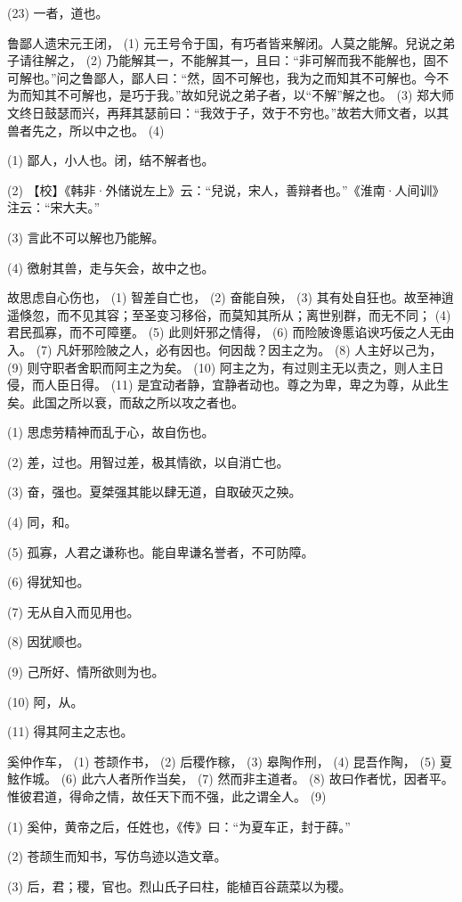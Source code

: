 \documentclass[12pt,UTF8]{ctexbook}
\begin{document}
(23) 一者，道也。

鲁鄙人遗宋元王闭， (1) 元王号令于国，有巧者皆来解闭。人莫之能解。兒说之弟子请往解之， (2) 乃能解其一，不能解其一，且曰：“非可解而我不能解也，固不可解也。”问之鲁鄙人，鄙人曰：“然，固不可解也，我为之而知其不可解也。今不为而知其不可解也，是巧于我。”故如兒说之弟子者，以“不解”解之也。 (3) 郑大师文终日鼓瑟而兴，再拜其瑟前曰：“我效于子，效于不穷也。”故若大师文者，以其兽者先之，所以中之也。 (4)

(1) 鄙人，小人也。闭，结不解者也。

(2) 【校】《韩非·外储说左上》云：“兒说，宋人，善辩者也。”《淮南·人间训》注云：“宋大夫。”

(3) 言此不可以解也乃能解。

(4) 徼射其兽，走与矢会，故中之也。

故思虑自心伤也， (1) 智差自亡也， (2) 奋能自殃， (3) 其有处自狂也。故至神逍遥倏忽，而不见其容；至圣变习移俗，而莫知其所从；离世别群，而无不同； (4) 君民孤寡，而不可障壅。 (5) 此则奸邪之情得， (6) 而险陂谗慝谄谀巧佞之人无由入。 (7) 凡奸邪险陂之人，必有因也。何因哉？因主之为。 (8) 人主好以己为， (9) 则守职者舍职而阿主之为矣。 (10) 阿主之为，有过则主无以责之，则人主日侵，而人臣日得。 (11) 是宜动者静，宜静者动也。尊之为卑，卑之为尊，从此生矣。此国之所以衰，而敌之所以攻之者也。

(1) 思虑劳精神而乱于心，故自伤也。

(2) 差，过也。用智过差，极其情欲，以自消亡也。

(3) 奋，强也。夏桀强其能以肆无道，自取破灭之殃。

(4) 同，和。

(5) 孤寡，人君之谦称也。能自卑谦名誉者，不可防障。

(6) 得犹知也。

(7) 无从自入而见用也。

(8) 因犹顺也。

(9) 己所好、情所欲则为也。

(10) 阿，从。

(11) 得其阿主之志也。

奚仲作车， (1) 苍颉作书， (2) 后稷作稼， (3) 皋陶作刑， (4) 昆吾作陶， (5) 夏鮌作城。 (6) 此六人者所作当矣， (7) 然而非主道者。 (8) 故曰作者忧，因者平。惟彼君道，得命之情，故任天下而不强，此之谓全人。 (9)

(1) 奚仲，黄帝之后，任姓也，《传》曰：“为夏车正，封于薛。”

(2) 苍颉生而知书，写仿鸟迹以造文章。

(3) 后，君；稷，官也。烈山氏子曰柱，能植百谷蔬菜以为稷。
\end{document}
